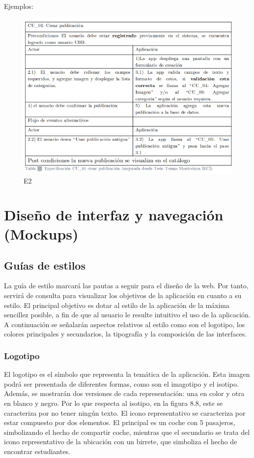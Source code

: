 Ejemplos:

\begin{figure}[H]
    \centering
    \includegraphics[scale=0.5]{figures/i13.png}
    \caption{E2}
    \label{fig:i13}
\end{figure}



\section{Diseño de interfaz y navegación (Mockups)}

\subsection{Guías de estilos}

La guía de estilo marcará las pautas a seguir para el diseño de la web. Por tanto, servirá
de consulta para visualizar los objetivos de la aplicación en cuanto a su estilo. El principal
objetivo es dotar al estilo de la aplicación de la máxima sencillez posible, a fin de que al
usuario le resulte intuitivo el uso de la aplicación.
A continuación se señalarán aspectos relativos al estilo como son el logotipo, los colores
principales y secundarios, la tipografía y la composición de las interfaces.
\subsubsection{Logotipo}
El logotipo es el símbolo que representa la temática de la aplicación. Esta imagen podrá ser presentada de diferentes formas, como son el imagotipo y el isotipo. Además, se mostrarán dos versiones de cada representación: una en color y otra en blanco y negro.
Por lo que respecta al isotipo, en la figura 8.8, este se caracteriza por no tener ningún texto. El icono representativo se caracteriza por estar compuesto por dos elementos. El principal es un coche con 5 pasajeros, simbolizando el hecho de compartir coche, mientras que el secundario se trata del icono representativo de la ubicación con un birrete, que simboliza el hecho de encontrar estudiantes.

